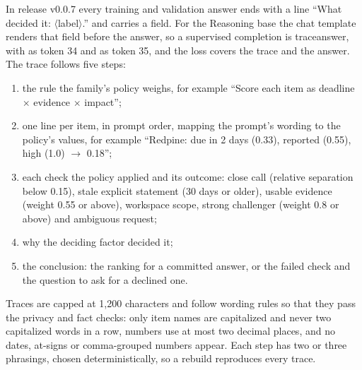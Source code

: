 In release v0.0.7 every training and validation answer ends with a line ``What decided it: $\langle$label$\rangle$.'' and carries a  field. For the Reasoning base the chat template renders that field before the answer, so a supervised completion is \code{[THINK]}trace\code{[/THINK]}answer, with \code{[THINK]} as token 34 and \code{[/THINK]} as token 35, and the loss covers the trace and the answer. The trace follows five steps:
\begin{enumerate}
  \item the rule the family's policy weighs, for example ``Score each item as deadline $\times$ evidence $\times$ impact'';
  \item one line per item, in prompt order, mapping the prompt's wording to the policy's values, for example ``Redpine: due in 2 days (0.33), reported (0.55), high (1.0) $\rightarrow$ 0.18'';
  \item each check the policy applied and its outcome: close call (relative separation below 0.15), stale explicit statement (30 days or older), usable evidence (weight 0.55 or above), workspace scope, strong challenger (weight 0.8 or above) and ambiguous request;
  \item why the deciding factor decided it;
  \item the conclusion: the ranking for a committed answer, or the failed check and the question to ask for a declined one.
\end{enumerate}
Traces are capped at 1,200 characters and follow wording rules so that they pass the privacy and fact checks: only item names are capitalized and never two capitalized words in a row, numbers use at most two decimal places, and no dates, at-signs or comma-grouped numbers appear. Each step has two or three phrasings, chosen deterministically, so a rebuild reproduces every trace.

